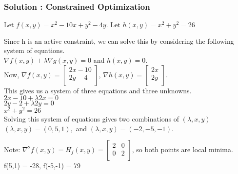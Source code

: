 \documentclass{beamer}
\begin{document}
\begin{frame}
\frametitle{Solution : Constrained Optimization}
Let $f(x,y) = x^2-10x + y^2 - 4y$. Let $h(x,y) = x^2+y^2 = 26$
\begin{solution}
Since h is an active constraint, we can solve this by considering the following system of equations.\\
\quad $\nabla f(x,y) + \lambda \nabla g(x,y) = 0$ and  $h(x,y) = 0$. \\
Now, 
$\nabla f(x,y) = 
\begin{bmatrix}
2x - 10  \\
2y - 4 \\
\end{bmatrix}$, 
$\nabla h(x,y) = 
\begin{bmatrix}
2x \\
2y \\
\end{bmatrix}$. \\
This gives us a system of three equations and three unknowns.\\
\quad $2x - 10 + \lambda 2 x = 0$ \\
\quad $2y - 2  + \lambda 2 y = 0$ \\
\quad $x^2+y^2 = 26$ \\
Solving this system of equations gives two combinations of $(\lambda, x, y)$\\
$(\lambda, x, y)  =  (0,5,1),$ and $(\lambda, x, y) = (-2,-5,-1)$.

Note: $\nabla^2 f(x,y) = H_f(x,y) = 
\begin{bmatrix}
2 & 0 \\
0 & 2 \\
\end{bmatrix}$, so both points are local minima. f(5,1) = -28, f(-5,-1) = 79 
\end{solution}
\end{frame}
\end{document}
